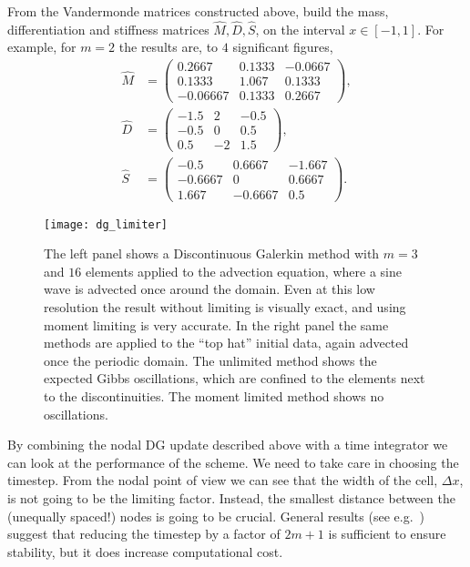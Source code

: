 \begin{exercise}
{From the Vandermonde matrices constructed above, build the mass, differentiation
and stiffness matrices $\hat{M}, \hat{D}, \hat{S}$, on the interval
$x \in [-1, 1]$. For example, for $m=2$ the results are, to $4$ significant
figures,
%
\begin{align*}
  \hat{M} &= \begin{pmatrix}
        0.2667 & 0.1333 & -0.0667 \\
        0.1333 & 1.067 & 0.1333 \\
        -0.06667 & 0.1333 & 0.2667
      \end{pmatrix}, \\
  \hat{D} &= \begin{pmatrix}
        -1.5 & 2 & -0.5 \\
        -0.5 & 0 & 0.5 \\
        0.5 & -2 & 1.5
      \end{pmatrix}, \\
  \hat{S} &= \begin{pmatrix}
        -0.5 & 0.6667 & -1.667 \\
        -0.6667 & 0 & 0.6667 \\
        1.667 & -0.6667 & 0.5
      \end{pmatrix}.
\end{align*}
}
\end{exercise}

\begin{figure}[t]
\centering
\texttt{[image: dg\_limiter]}
\caption[Discontinuous Galerkin methods in action]
{\label{fig:dg_limiter} The left panel shows a Discontinuous Galerkin method
with $m=3$ and $16$ elements applied to the advection equation, where a sine
wave is advected once around the domain. Even at this low resolution the result
without limiting is visually exact, and using moment limiting is very accurate.
In the right panel the same methods are applied to the ``top hat'' initial data,
again advected once the periodic domain. The unlimited method shows the expected
Gibbs oscillations, which are confined to the elements next to the
discontinuities. The moment limited method shows no oscillations. \\
}
\end{figure}
%
By combining the nodal DG update described above with a time integrator we can
look at the performance of the scheme. We need to take care in choosing the
timestep. From the nodal point of view we can see that the width of the cell,
$\Delta x$, is not going to be the limiting factor. Instead, the smallest
distance between the (unequally spaced!) nodes is going to be crucial. General
results (see e.g.~\cite{hesthaven2018numerical}) suggest that reducing the
timestep by a factor of $2 m + 1$ is sufficient to ensure stability, but it does
increase computational cost.

